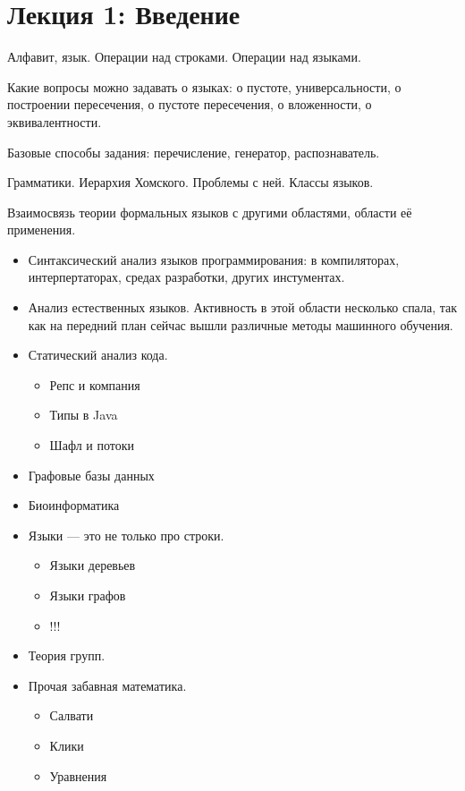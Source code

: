 \section{Лекция 1: Введение}

Алфавит, язык. Операции над строками. Операции над языками.

Какие вопросы можно задавать о языках: о пустоте, универсальности, о построении пересечения, о пустоте пересечения, о вложенности, о эквивалентности.

Базовые способы задания: перечисление, генератор, распознаватель.

Грамматики. Иерархия Хомского. Проблемы с ней. Классы языков.

Взаимосвязь теории формальных языков с другими областями, области её применения.
\begin{itemize}
  \item Синтаксический анализ языков программирования: в компиляторах, интерпертаторах, средах разработки, других инстументах.
  \item Анализ естественных языков.
  Активность в этой области несколько спала, так как на передний план сейчас вышли различные методы машинного обучения.
  \item Статический анализ кода.
  \begin{itemize}
    \item Репс и компания
    \item Типы в Java
    \item Шафл и потоки

  \end{itemize}
  \item Графовые базы данных
  \item Биоинформатика
  \item Языки --- это не только про строки.
  \begin{itemize}
    \item Языки деревьев
    \item Языки графов
    \item !!!
  \end{itemize}
  \item Теория групп.
  \item Прочая забавная математика.
  \begin{itemize}
    \item Салвати
    \item Клики
    \item Уравнения 
  \end{itemize}
\end{itemize}
